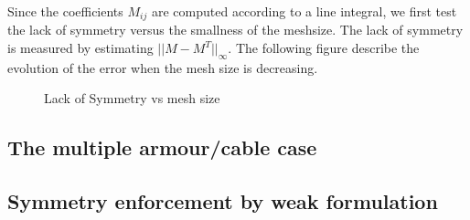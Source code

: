 Since the coefficients $M_{ij}$ are computed according to a line integral, we first test the lack of symmetry versus the smallness  of the meshsize. The lack of symmetry is measured by estimating $|| M-M^T ||_\infty$. The following figure describe the evolution of the error when the mesh size is decreasing.


\begin{figure}[h]
  \centering
  \caption{Lack of Symmetry vs mesh size}
\label{fig:symm}
\end{figure}


 
\subsection*{The multiple armour/cable case}

\subsection*{Symmetry enforcement by weak formulation}


